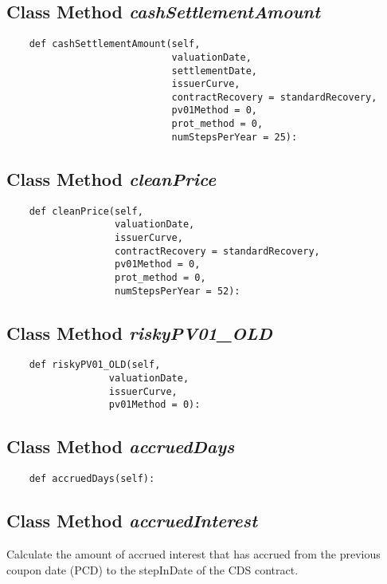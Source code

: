 \documentclass[twoside,11pt]{book}
\begin{document}
\subsection{Class Method {\it cashSettlementAmount}}


\begin{lstlisting}
    def cashSettlementAmount(self,
                             valuationDate,
                             settlementDate,
                             issuerCurve,
                             contractRecovery = standardRecovery,
                             pv01Method = 0,
                             prot_method = 0,
                             numStepsPerYear = 25):
\end{lstlisting}

\subsection{Class Method {\it cleanPrice}}


\begin{lstlisting}
    def cleanPrice(self,
                   valuationDate,
                   issuerCurve,
                   contractRecovery = standardRecovery,
                   pv01Method = 0,
                   prot_method = 0,
                   numStepsPerYear = 52):
\end{lstlisting}

\subsection{Class Method {\it riskyPV01\_OLD}}


\begin{lstlisting}
    def riskyPV01_OLD(self,
                  valuationDate,
                  issuerCurve,
                  pv01Method = 0):
\end{lstlisting}

\subsection{Class Method {\it accruedDays}}


\begin{lstlisting}
    def accruedDays(self):
\end{lstlisting}

\subsection{Class Method {\it accruedInterest}}
Calculate the amount of accrued interest that has accrued from the previous coupon date (PCD) to the stepInDate of the CDS contract. 
\end{document}
